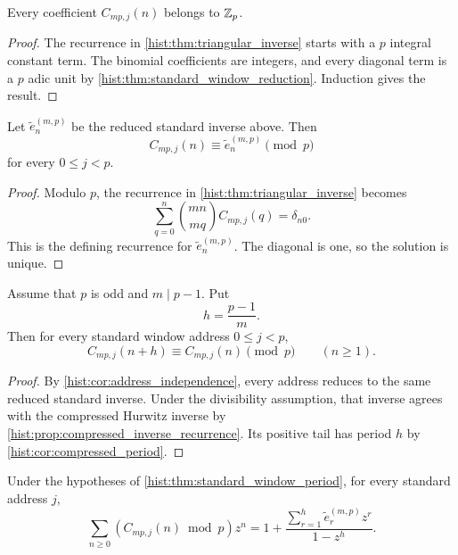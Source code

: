 \begin{histcorollary}\label{hist:cor:standard_integrality}
Every coefficient \(C_{mp,j}(n)\) belongs to \(\mathbb Z_p\).
\end{histcorollary}

\begin{proof}
The recurrence in \cref{hist:thm:triangular_inverse} starts with a \(p\) integral constant term. The binomial coefficients are integers, and every diagonal term is a \(p\) adic unit by \cref{hist:thm:standard_window_reduction}. Induction gives the result.
\end{proof}

\begin{histcorollary}\label{hist:cor:address_independence}
Let \(\widetilde e_n^{(m,p)}\) be the reduced standard inverse above. Then
\[
\boxed{
C_{mp,j}(n)
\equiv
\widetilde e_n^{(m,p)}
\pmod p
}
\]
for every \(0\leq j<p\).
\end{histcorollary}

\begin{proof}
Modulo \(p\), the recurrence in \cref{hist:thm:triangular_inverse} becomes
\[
\sum_{q=0}^{n}
\binom{mn}{mq}
C_{mp,j}(q)
=
\delta_{n0}.
\]
This is the defining recurrence for \(\widetilde e_n^{(m,p)}\). The diagonal is one, so the solution is unique.
\end{proof}

\begin{histtheorem}\label{hist:thm:standard_window_period}
Assume that \(p\) is odd and \(m\mid p-1\). Put
\[
h=\frac{p-1}{m}.
\]
Then for every standard window address \(0\leq j<p\),
\[
\boxed{
C_{mp,j}(n+h)
\equiv
C_{mp,j}(n)
\pmod p
\qquad(n\geq1).
}
\]
\end{histtheorem}

\begin{proof}
By \cref{hist:cor:address_independence}, every address reduces to the same reduced standard inverse. Under the divisibility assumption, that inverse agrees with the compressed Hurwitz inverse by \cref{hist:prop:compressed_inverse_recurrence}. Its positive tail has period \(h\) by \cref{hist:cor:compressed_period}.
\end{proof}

\begin{histcorollary}\label{hist:cor:standard_rational_ogf}
Under the hypotheses of \cref{hist:thm:standard_window_period}, for every standard address \(j\),
\[
\sum_{n\geq0}
\left(C_{mp,j}(n)\bmod p\right)z^n
=
1+
\frac{
\sum_{r=1}^{h}\widetilde e_r^{(m,p)}z^r
}{1-z^h}.
\]
\end{histcorollary}

